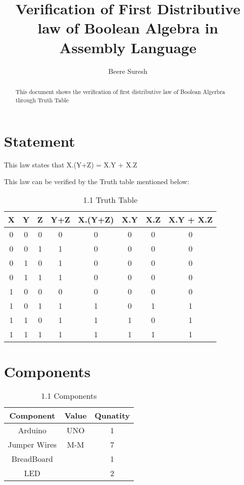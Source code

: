 \documentclass[journal,12pt,twocolumn]{IEEEtran}
\title{
Verification of First Distributive law of Boolean Algebra in Assembly Language
}
\author{Beere Suresh}
\begin{document}
\maketitle
\begin{abstract}
This document shows the verification of first distributive law of Boolean Algerbra through Truth Table
\end{abstract}
\section{Statement}
This law states that 
X.(Y+Z) = X.Y + X.Z

This law can be verified by the Truth table mentioned below:

    \begin{table}[h]
    \centering
    \begin{tabular}{| c | c | c | c | c | c | c | c |}
    \hline
    \textbf{X} & \textbf{Y} & \textbf{Z} & \textbf{Y+Z} & \textbf{X.(Y+Z)} & \textbf{X.Y} & \textbf{X.Z} & \textbf{X.Y + X.Z} \\
    \hline
    0 & 0 & 0 & 0 & 0 & 0 & 0 & 0  \\
    \hline
    0 & 0 & 1 & 1 & 0 & 0 & 0 & 0  \\
    \hline
    0 & 1 & 0 & 1 & 0 & 0 & 0 & 0  \\
    \hline
    0 & 1 & 1 & 1 & 0 & 0 & 0 & 0  \\
    \hline
   1 & 0 & 0 & 0 & 0 & 0 & 0 & 0  \\
    \hline
    1 & 0 & 1 & 1 & 1 & 0 & 1 & 1  \\
    \hline
   1 & 1 & 0 & 1 & 1 & 1 & 0 & 1  \\
    \hline
    1 & 1 & 1 & 1 & 1 & 1 & 1 & 1  \\
    \hline
    \end{tabular}
    \caption{1.1 Truth Table}
    \label{tab:my_label}
 \end{table}
\section{Components}
\begin{table}[h]
    \centering
    \begin{tabular}{| c | c | c |}
       \hline
       \textbf{Component}  &  \textbf{Value}  &  \textbf{Qunatity}\\
       \hline
         Arduino  & UNO & 1  \\
         \hline
         Jumper Wires  &  M-M  &  7  \\
         \hline
         BreadBoard  &    &  1\\
         \hline
        LED   &   &  2 \\
          \hline
\end{tabular}
\caption{1.1 Components}
\label{tab:my_label}
\end{table}
\end{document}
